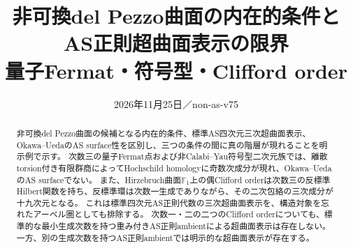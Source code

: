 \documentclass[11pt,a4paper]{ltjsarticle}
\title{非可換del Pezzo曲面の内在的条件とAS正則超曲面表示の限界\\\large 量子Fermat・符号型・Clifford order}
\author{}
\date{2026年11月25日／non-as-v75}
\theoremstyle{definition}
\begin{document}
\maketitle
\begin{abstract}
非可換del Pezzo曲面の候補となる内在的条件、標準AS四次元三次超曲面表示、Okawa--UedaのAS surface性を区別し、三つの条件の間に真の階層が現れることを明示例で示す。
次数三の量子Fermat点および非Calabi--Yau符号型二次元族では、離散torsion付き有限群商によってHochschild homologyに奇数次成分が現れ、Okawa--UedaのAS surfaceでない。
また、Hirzebruch曲面$\mathbb F_1$上の偶Clifford orderは次数三の反標準Hilbert関数を持ち、反標準環は次数一生成でありながら、その二次包絡の三次成分が十九次元となる。
これは標準四次元AS正則代数の三次超曲面表示を、構造対象を忘れたアーベル圏としても排除する。
次数一・二の二つのClifford orderについても、標準的な最小生成次数を持つ重み付きAS正則ambientによる超曲面表示は存在しない。一方、別の生成次数を持つAS正則ambientでは明示的な超曲面表示が存在する。

\end{abstract}
\end{document}
